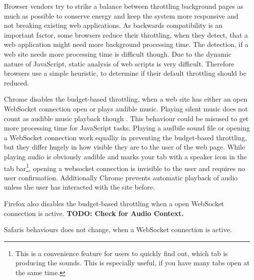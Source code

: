 \documentclass[article,type=bsc,colorback,accentcolor=tud9c]{tudthesis}
\begin{document}
  Browser vendors try to strike a balance between throttling background pages as much as possible to conserve energy and keep the system more responsive and not breaking existing web applications. As backwards compatibility is an important factor, some browsers reduce their throttling, when they detect, that a web application might need more background processing time. The detection, if a web site needs more processing time is difficult though. Due to the dynamic nature of JavaScript, static analysis of web scripts is very difficult. Therefore browsers use a simple heuristic, to determine if their default throttling should be reduced.

  Chrome disables the budget-based throttling, when a web site has either an open WebSocket connection open or plays audible music. Playing silent music does not count as audible music playback though \cite{chrome-background-tabs}. This behaviour could be misused to get more processing time for JavaScript tasks. Playing a audbile sound file or opening a WebSocket connection work equalliy in preventing the budget-based throttling, but they differ hugely in how visible they are to the user of the web page. While playing audio is obviously audible and marks your tab with a speaker icon in the tab bar\footnote{This is a convenience feature for users to quickly find out, which tab is producing the sounds. This is especially useful, if you have many tabs open at the same time.}, opening a websocket connection is invisible to the user and requires no user confirmation. Additionally Chrome prevents automatic playback of audio unless the user has interacted with the site before.

  Firefox also disables the budget-based throttling when a open WebSocket connection is active. \textbf{TODO: Check for Audio Context.}

  Safaris behaviours does not change, when a WebSocket connection is active.
\end{document}
